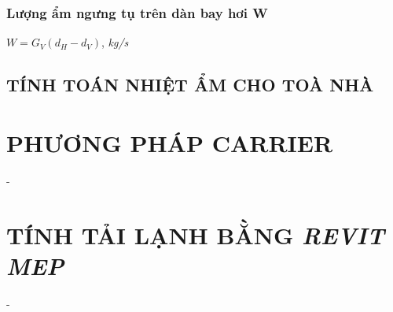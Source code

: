 \subsubsection{Lượng ẩm ngưng tụ trên dàn bay hơi W}
\begin{center}
	$W = G_{V}(d_{H}-d_{V})$, \textit{kg/s}
\end{center}

\subsection{TÍNH TOÁN NHIỆT ẨM CHO TOÀ NHÀ}




\section{PHƯƠNG PHÁP CARRIER}
\hspace{1cm}- 

\section{TÍNH TẢI LẠNH BẰNG \emph{REVIT MEP}}
\hspace{1cm}- 
